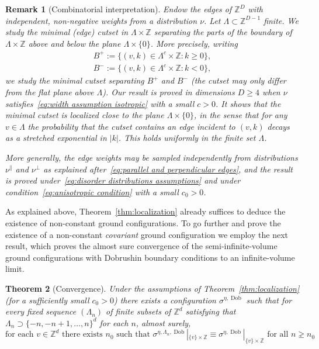 \documentclass[11pt, reqno]{amsart}
\newtheorem{theorem}{Theorem}[section]
\newtheorem{remark}[theorem]{Remark}
\newcommand{\Z}{\mathbb{Z}}
\DeclareMathOperator{\Dob}{Dob}
\numberwithin{equation}{section}
\begin{document}
\begin{remark}[Combinatorial interpretation] Endow the edges of $\Z^D$ with independent, non-negative weights from a distribution $\nu$. Let $\Lambda\subset\Z^{D-1}$ finite. We study the minimal (edge) cutset in $\Lambda\times\Z$ separating the parts of the boundary of $\Lambda\times\Z$ above and below the plane $\Lambda\times\{0\}$. More precisely, writing
\begin{equation}\begin{split}
B^+:=\{(v,k)\in\Lambda^c\times\Z\colon k\ge 0\},\\
B^-:=\{(v,k)\in\Lambda^c\times\Z\colon k< 0\},
\end{split}
\end{equation}
we study the minimal cutset separating $B^+$ and $B^-$ (the cutset may only differ from the flat plane above $\Lambda$). Our result is proved in dimensions $D\ge 4$ when $\nu$ satisfies~\eqref{eq:width assumption isotropic} with a small $c>0$. It shows that the minimal cutset is localized close to the plane $\Lambda\times\{0\}$, in the sense that for any $v\in\Lambda$ the probability that the cutset contains an edge incident to $(v,k)$ decays as a stretched exponential in $|k|$. This holds uniformly in the finite set $\Lambda$. 

More generally, the edge weights may be sampled independently from distributions $\nu^{\parallel}$ and $\nu^\perp$ as explained after~\eqref{eq:parallel and perpendicular edges}, and the result is proved under~\eqref{eq:disorder distributions assumptions} and under condition~\eqref{eq:anisotropic condition} with a small $c_0>0$.
\end{remark}

As explained above, Theorem~\ref{thm:localization} already suffices to deduce the existence of non-constant ground configurations. To go further and prove the existence of a non-constant \emph{covariant} ground configuration we employ the next result, which proves the almost sure convergence of the semi-infinite-volume ground configurations with Dobrushin boundary conditions to an infinite-volume limit.
\begin{theorem}[Convergence]\label{thm:convergence}
Under the assumptions of Theorem~\ref{thm:localization} (for a sufficiently small $c_0>0$) there exists a configuration $\sigma^{\eta,\Dob}$ such that 
for every fixed sequence $(\Lambda_n)$ of finite subsets of $\Z^d$ satisfying that $\Lambda_n\supset\{-n,-n+1,\ldots,n\}^d$ for each $n$, almost surely,
\begin{equation} \label{eq:convergence}
\text{for each $v\in\Z^{d}$ there exists $n_0$ such that $\sigma^{\eta,\Lambda_n,\Dob}|_{\{v\}\times\Z}\equiv\sigma^{\eta,\Dob}|_{\{v\}\times\Z}$ for all $n\ge n_0$}.
\end{equation}
\end{theorem}
\end{document}
